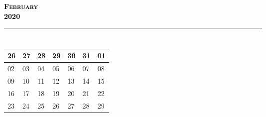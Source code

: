 \documentclass{article}
\newcommand{\daysize}{2.5cm}		%
\newcommand{\dw}{3.5cm}					%
\newcommand{\mkday}[1]{
  #1
  \vspace{\daysize}
}
\begin{document}
		\begin{center}
			\textsc{\LARGE \textbf{\textcolor{black}{
			February
			}}}\\ %
			\textsc{\large \textbf{\textcolor{black}{
			2020
			}}} %
		\end{center}

		\begin{center}
		\begin{tabular}{| p{\dw} | p{\dw} | p{\dw} | p{\dw} | p{\dw} | p{\dw} | p{\dw} |}
			\hline
			\cellcolor{bannercolor} \textcolor{white}{Sunday} &
			\cellcolor{bannercolor} \textcolor{white}{Monday} &
			\cellcolor{bannercolor} \textcolor{white}{Tuesday} &
			\cellcolor{bannercolor} \textcolor{white}{Wednesday} &
			\cellcolor{bannercolor} \textcolor{white}{Thursday} &
			\cellcolor{bannercolor} \textcolor{white}{Friday} &
			\cellcolor{bannercolor} \textcolor{white}{Saturday} \\
			\hline
		\end{tabular}

		\vspace{0.1cm}

		\begin{tabular}{| p{\dw} | p{\dw} | p{\dw} | p{\dw} | p{\dw} | p{\dw} | p{\dw} |}
\hline 
\cellcolor{weekendcolor}\mkday{
    26
} & 
\mkday{
    27
} &
\mkday{
    28
} &
\mkday{
    29
} &
\mkday{
    30
} &
\mkday{
    31
} &
\cellcolor{weekendcolor}\mkday{
    01
} 
\\
\hline 
\cellcolor{weekendcolor}\mkday{
    02
} & 
\mkday{
    03
} &
\mkday{
    04
} &
\mkday{
    05
} &
\mkday{
    06
} &
\mkday{
    07
} &
\cellcolor{weekendcolor}\mkday{
    08
} 
\\
\hline 
\cellcolor{weekendcolor}\mkday{
    09
} & 
\mkday{
    10
} &
\mkday{
    11
} &
\mkday{
    12
} &
\mkday{
    13
} &
\mkday{
    14
} &
\cellcolor{weekendcolor}\mkday{
    15
} 
\\
\hline 
\cellcolor{weekendcolor}\mkday{
    16
} & 
\mkday{
    17
} &
\mkday{
    18
} &
\mkday{
    19
} &
\mkday{
    20
} &
\mkday{
    21
} &
\cellcolor{weekendcolor}\mkday{
    22
} 
\\
\hline 
\cellcolor{weekendcolor}\mkday{
    23
} & 
\mkday{
    24
} &
\mkday{
    25
} &
\mkday{
    26
} &
\mkday{
    27
} &
\mkday{
    28
} &
\cellcolor{weekendcolor}\mkday{
    29
} 
\\
		\end{tabular}

		\end{center}
\end{document}
